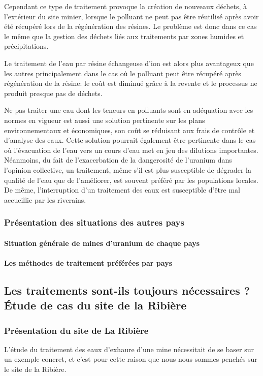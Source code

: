 \documentclass{article}
\begin{document}
Cependant ce type de traitement provoque la création de nouveaux déchets, à l’extérieur du site minier, lorsque le polluant ne peut pas être réutilisé après avoir été récupéré lors de la régénération des résines. Le problème est donc dans ce cas le même que la gestion des déchets liés aux traitements par zones humides et précipitations.

Le traitement de l’eau par résine échangeuse d’ion est alors plus avantageux que les autres principalement dans le cas où le polluant peut être récupéré après régénération de la résine: le coût est diminué grâce à la revente et le processus ne produit presque pas de déchets.

Ne pas traiter une eau dont les teneurs en polluants sont en adéquation avec les normes en vigueur est aussi une solution pertinente sur les plans environnementaux et économiques, son coût se réduisant aux frais de contrôle et d’analyse des eaux. Cette solution pourrait également être pertinente dans le cas où l’évacuation de l’eau vers un cours d’eau met en jeu des dilutions importantes. Néanmoins, du fait de l’exacerbation de la dangerosité de l’uranium dans l’opinion collective, un traitement, même s’il est plus susceptible de dégrader la qualité de l’eau que de l’améliorer, est souvent préféré par les populations locales. De même, l’interruption d’un traitement des eaux est susceptible d’être mal accueillie par les riverains.

\subsubsection{Présentation des situations des autres pays}
\paragraph{Situation générale de mines d’uranium de chaque pays}
\paragraph{Les méthodes de traitement préférées par pays}

\subsection{Les traitements sont-ils toujours nécessaires ? Étude de cas du site de la Ribière}
\subsubsection{Présentation du site de La Ribière}
L’étude du traitement des eaux d’exhaure d’une mine nécessitait de se baser sur un exemple concret, et c’est pour cette raison que nous nous sommes penchés sur le site de la Ribière. 
\end{document}
